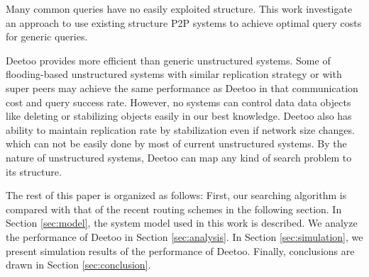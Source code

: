 \documentclass[conference]{IEEEtran}
\begin{document}
Many common queries have no easily exploited structure. 
This work investigate an approach to use existing structure P2P systems to achieve optimal query
costs for generic queries.

Deetoo provides more efficient than generic unstructured systems.  
Some of flooding-based unstructured systems with similar replication strategy or with super peers 
may achieve the same performance as Deetoo in that communication cost and query success rate. 
However, no systems can control data data objects like deleting or stabilizing objects easily in our best knowledge.
Deetoo also has ability to maintain replication rate by stabilization even if network size changes.
which can not be easily done by most of current unstructured systems.
By the nature of unstructured systems, Deetoo can map any kind of search problem to its structure.


The rest of this paper is organized as follows: First, our searching
algorithm is compared with that of the recent routing schemes in the following section. 
In Section \ref{sec:model}, the system model
used in this work is described. We analyze the performance of Deetoo in
Section \ref{sec:analysis}. In Section \ref{sec:simulation}, we present
simulation results of the performance of Deetoo. Finally, conclusions are 
drawn in Section \ref{sec:conclusion}.
\end{document}
